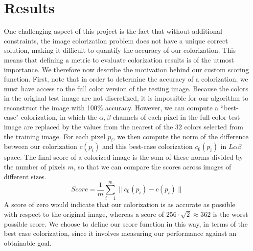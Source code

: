\section{Results}
\label{sec:results}

One challenging aspect of this project is the fact that without additional constraints, the image colorization problem does not have a unique correct solution, making it difficult to quantify the accuracy of our colorization.  This means that defining a metric to evaluate colorization results is of the utmost importance.  We therefore now describe the motivation behind our custom scoring function.  First, note that in order to determine the accuracy of a colorization, we must have access to the full color version of the testing image.  Because the colors in the original test image are not discretized, it is impossible for our algorithm to reconstruct the image with 100\% accuracy.  However, we can compute a ``best-case" colorization, in which the $\alpha, \beta$ channels of each pixel in the full color test image are replaced by the values from the nearest of the 32 colors selected from the training image.  For each pixel $p_i$, we then compute the norm of the difference between our colorization $c(p_i)$ and this best-case colorization $c_0(p_i)$ in $L\alpha\beta$ space.  The final score of a colorized image is the sum of these norms divided by the number of pixels $m$, so that we can compare the scores across images of different sizes.  
\begin{equation}
    \label{eq:score}
    \textit{Score} = \frac{1}{m}\sum_{i=1}^m \| c_0(p_i) - c(p_i)\|
\end{equation}
A score of zero would indicate that our colorization is as accurate as possible with respect to the original image, whereas a score of $256 \cdot \sqrt{2} \approx 362$ is the worst possible score.  We choose to define our score function in this way, in terms of the best case colorization, since it involves measuring our performance against an obtainable goal.

